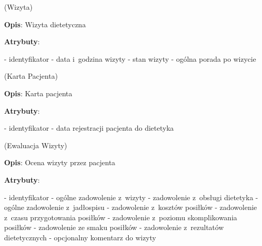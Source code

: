 \begin{enumerate}[label={\textbf{KAT/\protect\threedigits{\theenumi}}}, wide, labelwidth=!, labelindent=0pt, labelsep=0pt, series=reqs]
    \label{kat:Appointment} (Wizyta)

    \textbf{Opis}: Wizyta dietetyczna
    \par
    \textbf{Atrybuty}:
    \begin{itemize}[series=atr, wide, align=left, leftmargin=190pt]
        \label{kat:Appointment:id}- identyfikator
        \label{kat:Appointment:appointmentDate}- data i~godzina wizyty
        \label{kat:Appointment:appointmentState}- stan wizyty
        \label{kat:Appointment:generalAdvice}- ogólna porada po wizycie
    \end{itemize}

    \label{kat:PatientCard} (Karta Pacjenta)

    \textbf{Opis}: Karta pacjenta
    \par
    \textbf{Atrybuty}:
    \begin{itemize}[series=atr, wide, align=left, leftmargin=190pt]
        \label{kat:PatientCard:id}- identyfikator
        \label{kat:PatientCard:creationDate}- data rejestracji pacjenta do dietetyka
    \end{itemize}

    \label{kat:AppointmentEvaluation} (Ewaluacja Wizyty)

    \textbf{Opis}: Ocena wizyty przez pacjenta
    \par
    \textbf{Atrybuty}:
    \begin{itemize}[series=atr, wide, align=left, leftmargin=190pt]
        \label{kat:AppointmentEvaluation:id}- identyfikator
        \label{kat:AppointmentEvaluation:overallSatisfaction}- ogólne zadowolenie z~wizyty
        \label{kat:AppointmentEvaluation:dietitianServiceSatisfaction}- zadowolenie z~obsługi dietetyka
        \label{kat:AppointmentEvaluation:mealPlanOverallSatisfaction}- ogólne zadowolenie z~jadłospisu
        \label{kat:AppointmentEvaluation:mealCostSatisfaction}- zadowolenie z~kosztów posiłków
        \label{kat:AppointmentEvaluation:mealPreparationTimeSatisfaction}- zadowolenie z~czasu przygotowania posiłków
        \label{kat:AppointmentEvaluation:mealComplexityLevelSatisfaction}- zadowolenie z~poziomu skomplikowania posiłków
        \label{kat:AppointmentEvaluation:mealTastefulnessSatisfaction}- zadowolenie ze smaku posiłków
        \label{kat:AppointmentEvaluation:dietaryResultSatisfaction}- zadowolenie z~rezultatów dietetycznych
        \label{kat:AppointmentEvaluation:comment}- opcjonalny komentarz do wizyty
    \end{itemize}


\end{enumerate}
